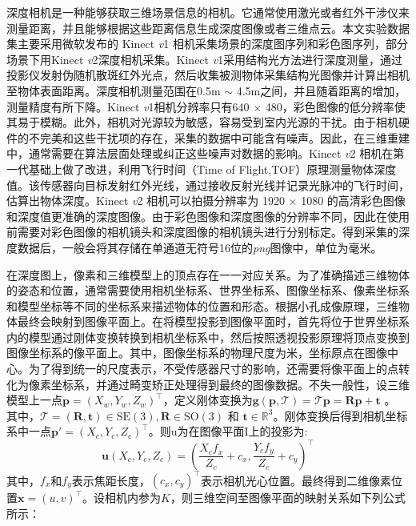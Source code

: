 深度相机是一种能够获取三维场景信息的相机。它通常使用激光或者红外干涉仪来测量距离，并且能够根据这些距离信息生成深度图像或者三维点云。本文实验数据集主要采用微软发布的 Kinect \emph{v}1 相机采集场景的深度图序列和彩色图序列，部分场景下用Kinect \emph{v}2深度相机采集。Kinect \emph{v}1采用结构光方法进行深度测量，通过投影仪发射伪随机散斑红外光点，然后收集被测物体采集结构光图像并计算出相机至物体表面距离。深度相机测量范围在0.5m $\sim$ 4.5m之间，并且随着距离的增加，测量精度有所下降。Kinect \emph{v}1相机分辨率只有640 $\times$ 480，彩色图像的低分辨率使其易于模糊。此外，相机对光源较为敏感，容易受到室内光源的干扰。由于相机硬件的不完美和这些干扰项的存在，采集的数据中可能含有噪声。因此，在三维重建中，通常需要在算法层面处理或纠正这些噪声对数据的影响。Kinect \emph{v}2 相机在第一代基础上做了改进，利用飞行时间（Time of Flight,TOF）原理测量物体深度值。该传感器向目标发射红外光线，通过接收反射光线并记录光脉冲的飞行时间，估算出物体深度。Kinect \emph{v}2 相机可以拍摄分辨率为 1920 $\times$ 1080 的高清彩色图像和深度值更准确的深度图像。由于彩色图像和深度图像的分辨率不同，因此在使用前需要对彩色图像的相机镜头和深度图像的相机镜头进行分别标定。得到采集的深度数据后，一般会将其存储在单通道无符号16位的\emph{png}图像中，单位为毫米。\par 
在深度图上，像素和三维模型上的顶点存在一一对应关系。为了准确描述三维物体的姿态和位置，通常需要使用相机坐标系、世界坐标系、图像坐标系、像素坐标系和模型坐标等不同的坐标系来描述物体的位置和形态。根据小孔成像原理，三维物体最终会映射到图像平面上。在将模型投影到图像平面时，首先将位于世界坐标系内的模型通过刚体变换转换到相机坐标系中，然后按照透视投影原理将顶点变换到图像坐标系的像平面上。其中，图像坐标系的物理尺度为米，坐标原点在图像中心。为了得到统一的尺度表示，不受传感器尺寸的影响，还需要将像平面上的点转化为像素坐标系，并通过畸变矫正处理得到最终的图像数据。不失一般性，设三维模型上一点$\boldsymbol{p} = (X_w,Y_w,Z_w)^\top $，定义刚体变换为$\mathbf{g}\left(\boldsymbol{p},\mathcal{T}\right)=\mathcal{T} \boldsymbol{p} = \boldsymbol{R} \boldsymbol{p}+\boldsymbol{t}$ 。
其中，$\mathcal{T}=\left(\boldsymbol{R},\boldsymbol{t}\right) \in \mathrm{SE} (3),\boldsymbol{R}   \in \mathrm{SO}(3) \text { 和 } \boldsymbol{t} \in \mathbb{R}^{3}$。刚体变换后得到相机坐标系中一点$\boldsymbol{p'}=(X_c,Y_c,Z_c)^\top$。则$\mathrm{u}$为在图像平面$\mathrm{I}$上的投影为:
\begin{equation}
 \mathbf{u}\left(X_c,Y_c,Z_c\right)=\left(\frac{X_{c} f_{x}}{Z_{c}}+c_{x},\frac{Y_{c} f_{y}}{Z_{c}}+c_{y}\right)^{\top}
\end{equation}
其中，$f_x$和$f_y$表示焦距长度，$\left(c_{x},c_{y}\right)^{\top}$表示相机光心位置。最终得到二维像素位置$\boldsymbol{x}=(u,v)^{\top}$。设相机内参为$K$，则三维空间至图像平面的映射关系如下列公式所示：
